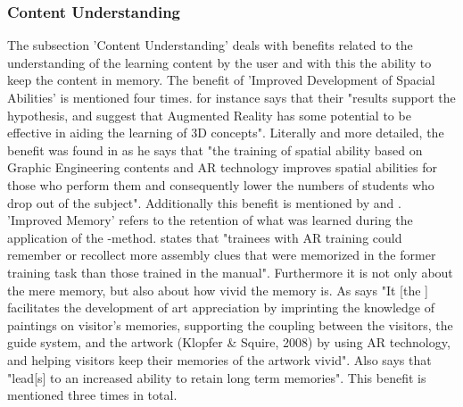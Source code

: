 \subsubsection{Content Understanding}
The subsection 'Content Understanding' deals with benefits related to the understanding of the learning content by the user and with this the ability to keep the content in memory.
The benefit of 'Improved Development of Spacial Abilities' is mentioned four times. \cite{Dunser.2012} for instance says that their "results support the hypothesis, and suggest that Augmented Reality has some potential to be effective 
in aiding the learning of 3D concepts"\autocite[112]{Dunser.2012}. Literally and more detailed, the benefit was found in \cite{MartinGutierrez.2011} as he says that "the training of spatial ability based on 
Graphic Engineering contents and AR technology improves spatial abilities for those who perform them and consequently lower the numbers of students who drop out of the subject"\autocite[5]{MartinGutierrez.2011}.
Additionally this benefit is mentioned by \cite{MartinGutierrez.2013} and \cite{Chen.2008}.\autocite[cf.][4]{MartinGutierrez.2013}\mulcit\autocite[cf.][5]{Chen.2008}
'Improved Memory' refers to the retention of what was learned during the application of the \ARns-method. \cite{Hou.2013} states that "trainees with AR training could remember or recollect more assembly 
clues that were memorized in the former training task than those trained in the manual"\autocite[450]{Hou.2013}. Furthermore it is not only about the mere memory, but also about how vivid the memory is. As \cite{Chang.2014}
says "It [the \AR \app] facilitates the development of art appreciation by imprinting the knowledge of paintings on visitor's memories, supporting the coupling between the visitors, the guide system, and the artwork (Klopfer \& Squire, 2008) by using 
AR technology, and helping visitors keep their memories of the artwork vivid"\autocite[193]{Chang.2014}. Also \cite{Macchiarella.2005} says that \AR "lead[s] to an increased ability to retain long term memories"\autocite[4]{Macchiarella.2005}.
This benefit is mentioned three times in total.

% 
